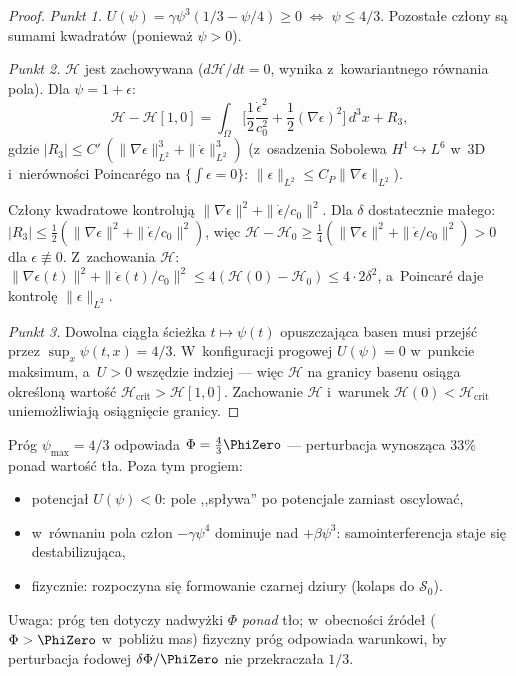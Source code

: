 \begin{proof}
\emph{Punkt 1.}\;
$U(\psi) = \gamma\psi^3(1/3 - \psi/4) \ge 0
\;\Leftrightarrow\; \psi \le 4/3$. Pozosta\l{}e cz\l{}ony s\k{a}
sumami kwadrat\'ow (poniewa\.z $\psi > 0$).

\emph{Punkt 2.}\;
$\mathcal{H}$ jest zachowywana ($d\mathcal{H}/dt = 0$,
wynika z~kowariantnego r\'ownania pola). Dla $\psi = 1 + \epsilon$:
\begin{equation}\label{eq:H-quadratic}
  \mathcal{H} - \mathcal{H}[1,0] =
  \int_\Omega \biggl[\frac{1}{2}\frac{\dot\epsilon^2}{c_0^2}
  + \frac{1}{2}(\nabla\epsilon)^2\biggr]\,d^3x + R_3,
\end{equation}
gdzie $|R_3| \le C'\,(\|\nabla\epsilon\|_{L^2}^3
+ \|\dot\epsilon\|_{L^2}^3)$
(z~osadzenia Sobolewa $H^1 \hookrightarrow L^6$ w~3D
i~nier\'owno\'sci Poincar\'ego na $\{\int\epsilon = 0\}$:
$\|\epsilon\|_{L^2} \le C_P\|\nabla\epsilon\|_{L^2}$).

Cz\l{}ony kwadratowe kontroluj\k{a} $\|\nabla\epsilon\|^2
+ \|\dot\epsilon/c_0\|^2$.
Dla $\delta$ dostatecznie ma\l{}ego: $|R_3| \le \tfrac{1}{2}
(\|\nabla\epsilon\|^2 + \|\dot\epsilon/c_0\|^2)$,
wi\k{e}c $\mathcal{H} - \mathcal{H}_0 \ge \tfrac{1}{4}
(\|\nabla\epsilon\|^2 + \|\dot\epsilon/c_0\|^2) > 0$
dla $\epsilon \not\equiv 0$.
Z~zachowania $\mathcal{H}$:
$\|\nabla\epsilon(t)\|^2 + \|\dot\epsilon(t)/c_0\|^2
\le 4(\mathcal{H}(0) - \mathcal{H}_0)
\le 4\cdot 2\delta^2$,
a~Poincar\'e daje kontrol\k{e} $\|\epsilon\|_{L^2}$.

\emph{Punkt 3.}\;
Dowolna ci\k{a}g\l{}a \'scie\.zka $t \mapsto \psi(t)$
opuszczaj\k{a}ca basen musi przej\'s\'c przez
$\sup_x \psi(t,x) = 4/3$. W~konfiguracji progowej
$U(\psi) = 0$ w~punkcie maksimum, a~$U > 0$ wsz\k{e}dzie
indziej --- wi\k{e}c $\mathcal{H}$ na granicy basenu
osi\k{a}ga okre\'slon\k{a} warto\'s\'c
$\mathcal{H}_{\mathrm{crit}} > \mathcal{H}[1,0]$.
Zachowanie $\mathcal{H}$ i~warunek
$\mathcal{H}(0) < \mathcal{H}_{\mathrm{crit}}$
uniemo\.zliwiaj\k{a} osi\k{a}gni\k{e}cie granicy.
\end{proof}

\begin{remark}%
\label{rem:basin-interpretation}
Pr\'og $\psi_{\max} = 4/3$ odpowiada $\Phi = \tfrac{4}{3}\PhiZero$
--- perturbacja wynosz\k{a}ca $33\%$ ponad warto\'s\'c t\l{}a.
Poza tym progiem:
\begin{itemize}[nosep]
  \item potencja\l{} $U(\psi) < 0$: pole ,,sp\l{}ywa''
    po potencjale zamiast oscylowa\'c,
  \item w~r\'ownaniu pola cz\l{}on $-\gamma\psi^4$ dominuje
    nad $+\beta\psi^3$: samointerferencja staje si\k{e}
    destabilizuj\k{a}ca,
  \item fizycznie: rozpoczyna si\k{e} formowanie
    czarnej dziury (kolaps do $\mathcal{S}_0$).
\end{itemize}
Uwaga: pr\'og ten dotyczy nadwy\.zki $\Phi$ \emph{ponad}
t\l{}o; w~obecno\'sci \'zr\'ode\l{} ($\Phi > \PhiZero$
w~pobli\.zu mas) fizyczny pr\'og odpowiada warunkowi,
by perturbacja \'rodowej $\delta\Phi/\PhiZero$ nie
przekracza\l{}a $1/3$.
\end{remark}

